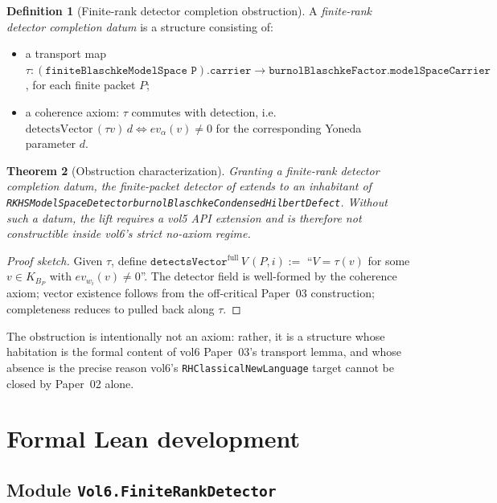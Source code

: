 \documentclass[12pt]{article}
\newtheorem{theorem}{Theorem}[section]
\theoremstyle{definition}
\newtheorem{definition}[theorem]{Definition}
\theoremstyle{remark}
\newcommand{\KBP}{K_{B_{P}}}
\begin{document}
\begin{definition}[Finite-rank detector completion obstruction]\label{def:obstruction}
A \emph{finite-rank detector completion datum} is a structure consisting of:
\begin{itemize}\itemsep0pt
  \item a transport map
        $\tau:(\texttt{finiteBlaschkeModelSpace P}).\texttt{carrier}\to
        \texttt{burnolBlaschkeFactor.modelSpaceCarrier}$, for each finite
        packet $P$;
  \item a coherence axiom: $\tau$ commutes with detection, i.e.
        $\mathrm{detectsVector}\,(\tau v)\,d\Leftrightarrow ev_{\alpha}(v)\neq0$
        for the corresponding Yoneda parameter $d$.
\end{itemize}
\end{definition}

\begin{theorem}[Obstruction characterization]\label{thm:obstruction-char}
Granting a finite-rank detector completion datum, the finite-packet
detector of  extends to an inhabitant of
\texttt{RKHSModelSpaceDetector\;burnolBlaschkeCondensedHilbertDefect}.
Without such a datum, the lift requires a vol5 API extension and is
therefore not constructible inside vol6's strict no-axiom regime.
\end{theorem}

\begin{proof}[Proof sketch]
Given $\tau$, define
$\texttt{detectsVector}^{\mathrm{full}}\,V\,(P,i):=$
``$V=\tau(v)$ for some $v\in\KBP$ with
$ev_{w_{i}}(v)\neq0$''. The detector field is well-formed by the
coherence axiom; vector existence follows from the off-critical
Paper~03 construction; completeness reduces to
 pulled back along $\tau$.
\end{proof}

The obstruction is intentionally not an axiom: rather, it is a structure
whose habitation is the formal content of vol6 Paper~03's transport lemma,
and whose absence is the precise reason vol6's
\texttt{RHClassicalNewLanguage} target cannot be closed by Paper~02 alone.

\section{Formal Lean development}\label{sec:lean}

\subsection{Module \texttt{Vol6.FiniteRankDetector}}
\end{document}
